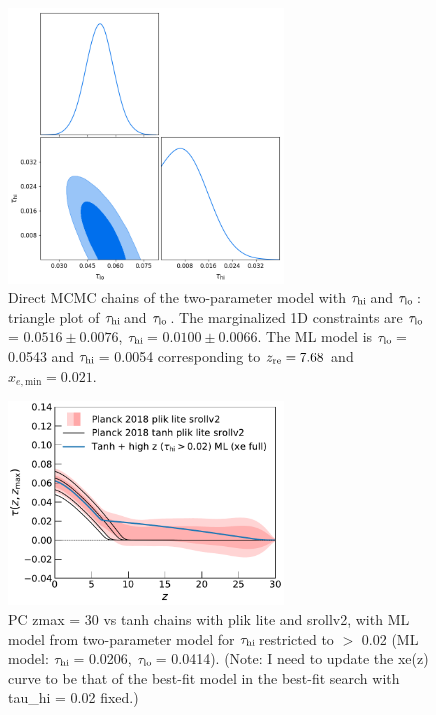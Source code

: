 \documentclass[prd,amsmath,amssymb,floatfix,superscriptaddress,nofootinbib]{revtex4-1}
\newcommand{\tauhi}{$\tau_{\rm hi}\,$}
\newcommand{\taulo}{$\tau_{\rm lo}\,$}
\begin{document}
\begin{figure}
\includegraphics[width=0.65\textwidth]{results/direct_mcmc/two_parameter_model/tauhi_taulo_chains/pl18_tanh_highz_test2_run1_tri.png}
\caption{Direct MCMC chains of the two-parameter model with \tauhi and \taulo: triangle plot of \tauhi and \taulo. The marginalized 1D constraints are \taulo = $0.0516 \pm 0.0076$, \tauhi = $0.0100 \pm   0.0066$. The ML model is \taulo = 0.0543 and \tauhi = 0.0054 corresponding to $z_{\rm re} = 7.68$ and $x_{e, \mathrm{min}} = 0.021$.
}
\label{fig:two_parameter_model_2D_plot}
\end{figure}

 \begin{figure}
\includegraphics[width=0.65\textwidth]{   results/direct_mcmc/pl18_plots_zmax30/plot_pub_tau_gtz_dz_0p1_pl18_pc_zmax30_pliklite_srollv2_0930_and_pl18_tanh_post_pliklite_srollv2_with_added_two_parameter_ML_xe_full.pdf}
\caption{PC zmax = 30 vs tanh chains with plik lite and srollv2, with ML model from two-parameter model for \tauhi restricted to $>$ 0.02 (ML model: \tauhi = 0.0206, \taulo = 0.0414). (Note: I need to update the xe(z) curve to be that of the best-fit model in the best-fit search with tau_hi = 0.02 fixed.)
}
\label{fig:two_parameter_model_ML}
\end{figure}
\end{document}
